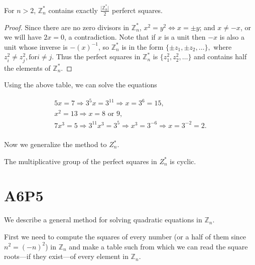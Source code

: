 \documentclass{article}
\begin{document}
\begin{theorem}
For $n>2$, $\mathbb{Z}^*_n$ contains exactly $\frac{\vert \mathbb{Z}^*_n \vert}{2}$ perferct squares.
\end{theorem}
\begin{proof}
Since there are no zero divisors in $\mathbb{Z}^*_n$, $x^2 = y^2 \Leftrightarrow x=\pm y$; and $x \not =-x$, or we will have $2x = 0$, a contradiction. Note that if $x$ is a unit then $-x$ is also a unit whose inverse is $-(x)^{-1}$, so $\mathbb{Z}^*_n$ is in the form $\{ \pm z_1, \pm z_2,\ldots \},$ where $z_i^2 \not = z_j^2, \text{for} i \not = j$. Thus the perfect squares in $\mathbb{Z}^*_n$ is $\{z_1^2, z_2^2, \ldots\}$ and contains half the elements of $\mathbb{Z}^*_n.$
\end{proof}

\begin{example}
Using the above table, we can solve the equations
\end{example}
\begin{gather}
5x=7 \Rightarrow 3^5x=3^{11} \Rightarrow x=3^6=15,  \\
x^2=13 \Rightarrow x = 8 \text{ or } 9, \\ 
7x^3=5 \Rightarrow 3^{11}x^3=3^5 \Rightarrow x^3 = 3^{-6} \Rightarrow x = 3^{-2} = 2. \\
\end{gather}

Now we generalize the method to $Z^*_n.$
\begin{theorem}
The multiplicative group of the perfect squares in $Z^*_n$ is cyclic.
\end{theorem}


\section{A6P5}
We describe a general method for solving quadratic equations in $\mathbb{Z}_n$. 

First we need to compute the squares of every number (or a half of them since $n^2 = (-n)^2$) in $\mathbb{Z}_n$ and make a table such from which we can read the square roots---if they exist---of every element in $\mathbb{Z}_n$.
\end{document}
